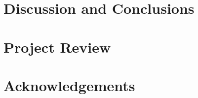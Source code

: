 \documentclass{article}
\begin{document}
\section{Discussion and Conclusions}


\section{Project Review}


\section{Acknowledgements}




\end{document}
